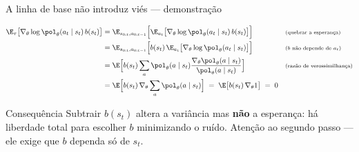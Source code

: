 \documentclass[aspectratio=169, 11pt]{beamer}
\newcommand{\thv}{\theta}                       %
\newcommand{\polth}{\pol_{\thv}}                %
\newcommand{\gth}{\nabla_{\thv}}                %
\newcommand{\traj}{\tau}                        %
\begin{document}
\begin{frame}{A linha de base não introduz viés --- demonstração}

  {\small
  \begin{align*}
    \E_{\traj}\bigl[\gth \log \polth(a_t\mid s_t)\, b(s_t)\bigr]
      &= \E_{s_{0:t},a_{0:t-1}}\Bigl[\E_{a_t}\bigl[\gth \log \polth(a_t\mid s_t)\, b(s_t)\bigr]\Bigr]
        &&\text{\scriptsize (quebrar a esperança)}\\
      &= \E_{s_{0:t},a_{0:t-1}}\Bigl[b(s_t)\,\E_{a_t}\bigl[\gth \log \polth(a_t\mid s_t)\bigr]\Bigr]
        &&\text{\scriptsize ($b$ não depende de $a_t$)}\\
      &= \E\Bigl[b(s_t) \sum_{a} \polth(a\mid s_t)
         \frac{\gth \polth(a\mid s_t)}{\polth(a\mid s_t)}\Bigr]
        &&\text{\scriptsize (razão de verossimilhança)}\\
      &= \E\Bigl[b(s_t)\, \gth \sum_{a} \polth(a\mid s_t)\Bigr]
      \;=\; \E\bigl[b(s_t)\, \gth 1\bigr] \;=\; 0
  \end{align*}}
  \vspace{-0.6em}

  \begin{teobox}{Consequência}
    Subtrair $b(s_t)$ altera a variância mas \textbf{não} a esperança: há
    liberdade total para escolher $b$ minimizando o ruído. Atenção ao segundo
    passo --- ele exige que $b$ dependa só de $s_t$.
  \end{teobox}
\end{frame}
\end{document}
